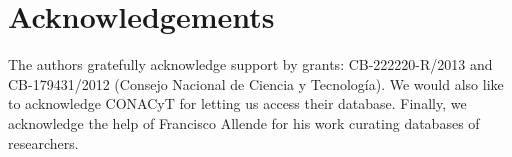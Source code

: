 \documentclass[11pt]{article}
\begin{document}
{%
%
%
%


\section{Acknowledgements}
The authors gratefully acknowledge support by grants: CB-222220-R/2013 and
CB-179431/2012 (Consejo Nacional de Ciencia y Tecnolog\'ia). We would also like
to acknowledge CONACyT for letting us access their database. Finally, we
acknowledge the help of Francisco Allende for his work curating 
databases of researchers.








}
\end{document}
